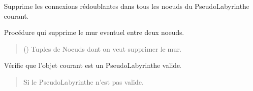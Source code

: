 \documentclass[letterpaper,10pt,french]{sphinxmanual}
\begin{document}
\begin{fulllineitems}
\begin{fulllineitems}
\end{fulllineitems}


\begin{fulllineitems}
\label{\detokenize{src:src.utilites.PseudoLabyrinthe.supprime_connexions_redoublantes}}
\pysigstartsignatures
{}
\pysigstopsignatures
\sphinxAtStartPar
Supprime les connexions rédoublantes dans tous les noeuds du PseudoLabyrinthe courant.

\end{fulllineitems}


\begin{fulllineitems}
\label{\detokenize{src:src.utilites.PseudoLabyrinthe.supprime_murs}}
\pysigstartsignatures
{}
\pysigstopsignatures
\sphinxAtStartPar
Procédure qui supprime le mur eventuel entre deux noeuds.
\begin{quote}\begin{description}
\sphinxAtStartPar
{} () \textendash{} Tuples de Noeuds dont on veut supprimer le mur.

\end{description}\end{quote}

\end{fulllineitems}


\begin{fulllineitems}
\label{\detokenize{src:src.utilites.PseudoLabyrinthe.verifie}}
\pysigstartsignatures
{}
\pysigstopsignatures
\sphinxAtStartPar
Vérifie que l’objet courant est un PseudoLabyrinthe valide.
\begin{quote}\begin{description}
\sphinxAtStartPar
{} \textendash{} Si le PseudoLabyrinthe n’est pas valide.


\end{description}
\end{quote}
\end{fulllineitems}
\end{fulllineitems}
\end{document}
